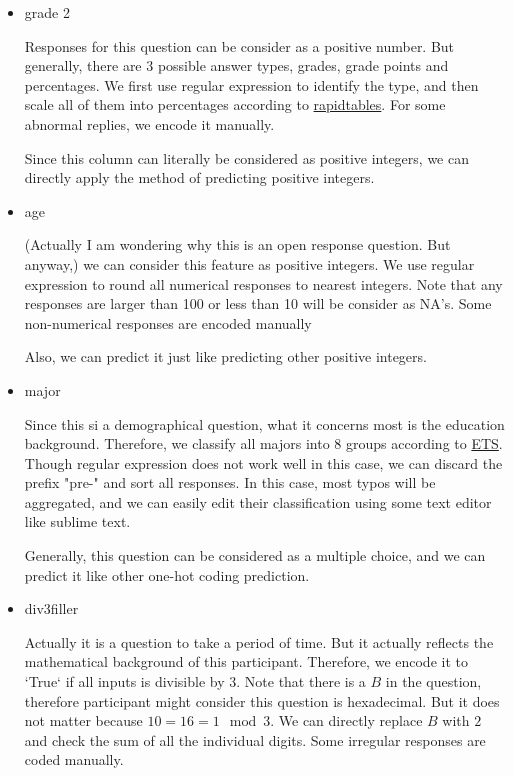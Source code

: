 \documentclass[11pt, a4paper]{article}
\begin{document}
\begin{itemize}
	\item {grade 2}
	\par{Responses for this question can be consider as a positive number. But generally, there are 3 possible answer types, grades, grade points and percentages. We first use regular expression to identify the type, and then scale all of them into percentages according to \href{https://www.rapidtables.com/calc/grade/gpa-to-letter-grade-calculator.html}{rapidtables}. For some abnormal replies, we encode it manually.}
	\par{Since this column can literally be considered as positive integers, we can directly apply the method of predicting positive integers.}
	
	\item {age}
	\par{(Actually I am wondering why this is an open response question. But anyway,) we can consider this feature as positive integers. We use regular expression to round all numerical responses to nearest integers. Note that any responses are larger than 100 or less than 10 will be consider as NA's. Some non-numerical responses are encoded manually}
	\par{Also, we can predict it just like predicting other positive integers.}
	
	\item {major}
	\par{Since this si a demographical question, what it concerns most is the education background. Therefore, we classify all majors into 8 groups according to \href{https://www.ets.org/s/gre/pdf/dept_major_field_codes.pdf}{ETS}. Though regular expression does not work well in this case, we can discard the prefix "pre-" and sort all responses. In this case, most typos will be aggregated, and we can easily edit their classification using some text editor like sublime text.}
	\par{Generally, this question can be considered as a multiple choice, and we can predict it like other one-hot coding prediction.}
	
	\item {div3filler}
	\par{Actually it is a question to take a period of time. But it actually reflects the mathematical background of this participant. Therefore, we encode it to `True` if all inputs is divisible by 3. Note that there is a $B$ in the question, therefore participant might consider this question is hexadecimal. But it does not matter because $10 = 16 = 1 \mod 3$. We can directly replace $B$ with $2$ and check the sum of all the individual digits. Some irregular responses are coded manually.}
	

\end{itemize}
\end{document}
